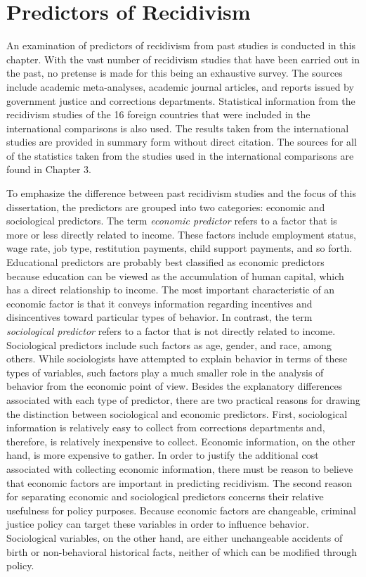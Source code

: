 \chapter{Predictors of Recidivism}

An examination of predictors of recidivism from past studies is conducted in this chapter.  With the vast number of recidivism studies that have been carried out in the past, no pretense is made for this being an exhaustive survey. The sources include academic meta-analyses, academic journal articles, and reports issued by government justice and corrections departments.  Statistical information from the recidivism studies of the 16 foreign countries that were included in the international comparisons is also used.  The results taken from the international studies are provided in summary form without direct citation.  The sources for all of the statistics taken from the studies used in the international comparisons are found in Chapter 3.

To emphasize the difference between past recidivism studies and the focus of this dissertation, the predictors are grouped into two categories:  economic and sociological predictors.  The term \emph{economic predictor} refers to a factor that is more or less directly related to income.  These factors include employment status, wage rate, job type, restitution payments, child support payments, and so forth.  Educational predictors are probably best classified as economic predictors because education can be viewed as the accumulation of human capital, which has a direct relationship to income.  The most important characteristic of an economic factor is that it conveys information regarding incentives and disincentives toward particular types of behavior.  In contrast, the term \emph{sociological predictor} refers to a factor that is not directly related to income.  Sociological predictors include such factors as age, gender, and race, among others.  While sociologists have attempted to explain behavior in terms of these types of variables, such factors play a much smaller role in the analysis of behavior from the economic point of view.  Besides the explanatory differences associated with each type of predictor, there are two practical reasons for drawing the distinction between sociological and economic predictors.  First, sociological information is relatively easy to collect from corrections departments and, therefore, is relatively inexpensive to collect.  Economic information, on the other hand, is more expensive to gather.  In order to justify the additional cost associated with collecting economic information, there must be reason to believe that economic factors are important in predicting recidivism.  The second reason for separating economic and sociological predictors concerns their relative usefulness for policy purposes. Because economic factors are changeable, criminal justice policy can target these variables in order to influence behavior.  Sociological variables, on the other hand, are either unchangeable accidents of birth or non-behavioral historical facts, neither of which can be modified through policy.

